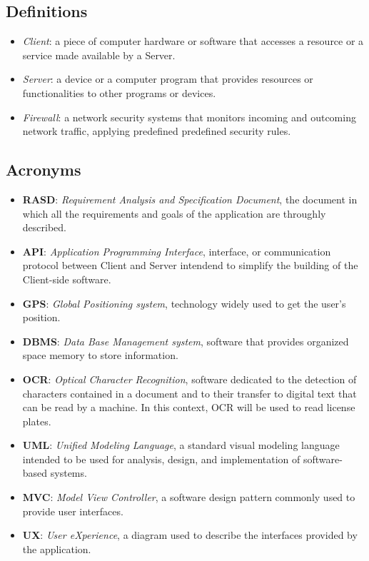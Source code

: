 \documentclass{report}
\begin{document}
\subsection{Definitions}
\begin{itemize}
    \item \textit{Client}: a piece of computer hardware or software that accesses a resource or a service made available by a Server.
    \item \textit{Server}: a device or a computer program that provides resources or functionalities to other programs or devices.
    \item \textit{Firewall}: a network security systems that monitors incoming and outcoming network traffic, applying predefined predefined security rules.
\end{itemize}
\subsection{Acronyms}
\begin{itemize}
    \item \textbf{RASD}: \textit{Requirement Analysis and Specification Document}, the document in which all the requirements and goals of the application are throughly described.
    \item \textbf{API}: \textit{Application Programming Interface}, interface, or communication protocol between Client and Server intendend to simplify the building of the Client-side software.
    \item \textbf{GPS}: \textit{Global Positioning system}, technology widely used to get the user's position.
    \item \textbf{DBMS}: \textit{Data Base Management system}, software that provides organized space memory to store information.
    \item \textbf{OCR}: \textit{Optical Character Recognition}, software dedicated to the detection of characters contained in a document and to their transfer to digital text that can be read by a machine. In this context, OCR will be used to read license plates.
    \item \textbf{UML}: \textit{Unified Modeling Language}, a standard visual modeling language intended to be used for analysis, design, and implementation of software-based systems.
    \item \textbf{MVC}: \textit{Model View Controller}, a software design pattern commonly used to provide user interfaces.
    \item \textbf{UX}: \textit{User eXperience}, a diagram used to describe the interfaces provided by the application.
    \end{itemize}
\end{document}
